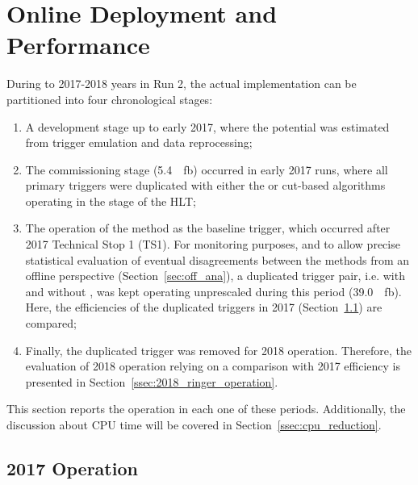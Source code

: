 \section{Online Deployment and Performance}%
\label{sec:operation}


 During to 2017-2018 years in Run 2, the actual \rnn{} implementation can be partitioned into four chronological stages:

\begin{enumerate}[i]
  \item A development stage up to early 2017, where the \rnn{}
      potential was estimated from trigger emulation and data reprocessing;
  \item The commissioning stage (\SI{5.4}{\per\femto\barn}) occurred in
      early 2017 runs, where all primary
      triggers were duplicated with either the \rnn{} or cut-based algorithms
      operating in the \fastcalo{} stage of the HLT;
  \item The operation of the method as the baseline trigger, which occurred after 2017 Technical Stop 1 (TS1). For
    monitoring purposes, and to allow precise statistical evaluation of eventual
    disagreements between the \fastcalo{} methods from an offline
    perspective (Section~\ref{sec:off_ana}), a duplicated trigger pair, i.e.
    with and without \rnn{}, was kept operating unprescaled during this period
    (\SI{39.0}{\per\femto\barn}). Here, the efficiencies of the
    duplicated triggers in 2017 (Section~\ref{ssec:2017_ringer_operation}) are compared;
  \item Finally, the duplicated trigger was removed for 2018 operation.
    Therefore, the evaluation of 2018 \rnn{} operation relying on a comparison with
    2017 efficiency is presented in Section~\ref{ssec:2018_ringer_operation}.
\end{enumerate}

This section reports the \rnn{} operation in each one of these periods. Additionally, the discussion about CPU time will be covered in Section~\ref{ssec:cpu_reduction}.

\subsection{2017 Operation}\label{ssec:2017_ringer_operation}

